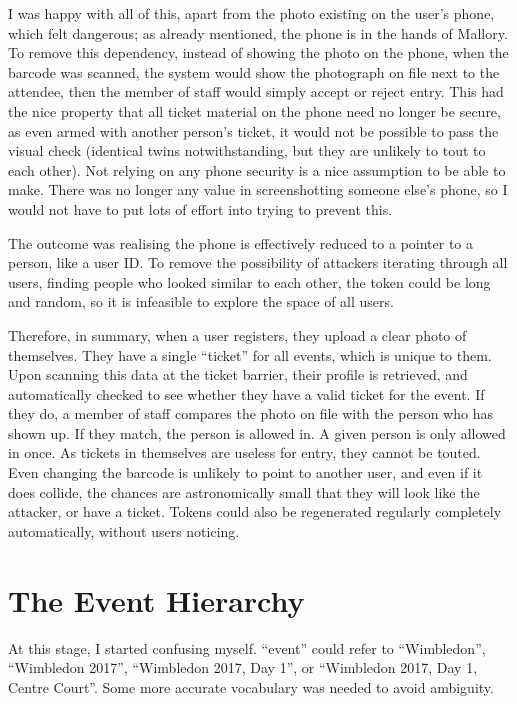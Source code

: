 \documentclass[12pt]{bhamdissertation}
\begin{document}
I was happy with all of this, apart from the photo existing on the user's phone, which felt dangerous; as already mentioned, the phone is in the hands of Mallory. To remove this dependency, instead of showing the photo on the phone, when the barcode was scanned, the system would show the photograph on file next to the attendee, then the member of staff would simply accept or reject entry. This had the nice property that all ticket material on the phone need no longer be secure, as even armed with another person's ticket, it would not be possible to pass the visual check (identical twins notwithstanding, but they are unlikely to tout to each other). Not relying on any phone security is a nice assumption to be able to make. There was no longer any value in screenshotting someone else's phone, so I would not have to put lots of effort into trying to prevent this.

The outcome was realising the phone is effectively reduced to a pointer to a person, like a user ID. To remove the possibility of attackers iterating through all users, finding people who looked similar to each other, the token could be long and random, so it is infeasible to explore the space of all users.

Therefore, in summary, when a user registers, they upload a clear photo of themselves. They have a single ``ticket'' for all events, which is unique to them. Upon scanning this data at the ticket barrier, their profile is retrieved, and automatically checked to see whether they have a valid ticket for the event. If they do, a member of staff compares the photo on file with the person who has shown up. If they match, the person is allowed in. A given person is only allowed in once. As tickets in themselves are useless for entry, they cannot be touted. Even changing the barcode is unlikely to point to another user, and even if it does collide, the chances are astronomically small that they will look like the attacker, or have a ticket. Tokens could also be regenerated regularly completely automatically, without users noticing.

\section{The Event Hierarchy}

At this stage, I started confusing myself. ``event'' could refer to ``Wimbledon'', ``Wimbledon 2017'', ``Wimbledon 2017, Day 1'', or ``Wimbledon 2017, Day 1, Centre Court''. Some more accurate vocabulary was needed to avoid ambiguity.
\end{document}
